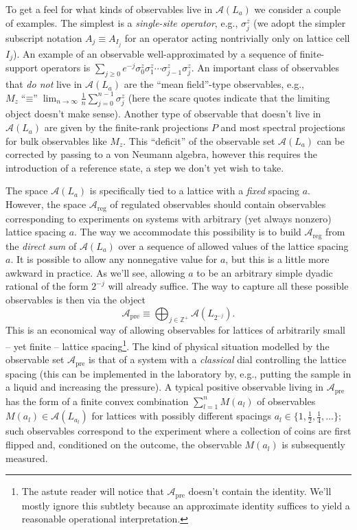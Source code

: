 \documentclass[11pt]{amsart}
\theoremstyle{plain}%
\theoremstyle{definition}
\theoremstyle{remark}
\begin{document}
To get a feel for what kinds of observables live in $\mathcal{A}(L_a)$ we consider a couple of examples. The simplest is a \emph{single-site operator}, e.g., $\sigma^z_j$ (we adopt the simpler subscript notation $A_j \equiv A_{I_j}$ for an operator acting nontrivially only on lattice cell $I_j$). An example of an observable well-approximated by a sequence of finite-support operators is $\sum_{j\ge 0} e^{-j}\sigma^z_0 \sigma_1^z  \cdots \sigma_{j-1}^z\sigma_j^z$. An important class of observables that \emph{do not} live in $\mathcal{A}(L_a)$ are the ``mean field''-type observables, e.g., $M_z \text{``$\equiv$''} \lim_{n\rightarrow\infty}\frac{1}{n}\sum_{j = 0}^{n-1} \sigma^z_j$ (here the scare quotes indicate that the limiting object doesn't make sense). Another type of observable that doesn't live in $\mathcal{A}(L_a)$ are given by the finite-rank projections $P$  and most spectral projections for bulk observables like $M_z$. This ``deficit'' of the observable set $\mathcal{A}(L_a)$ can be corrected by passing to a von Neumann algebra, however this requires the introduction of a reference state, a step we don't yet wish to take. 

The space $\mathcal{A}(L_a)$ is specifically tied to a lattice with a \emph{fixed} spacing $a$. However, the space $\mathcal{A}_{\text{reg}}$ of regulated observables should contain observables corresponding to experiments on systems with arbitrary (yet always nonzero) lattice spacing $a$. The way we accommodate this possibility is to build $\mathcal{A}_{\text{reg}}$ from the \emph{direct sum} of $\mathcal{A}(L_a)$ over a sequence of allowed values of the lattice spacing $a$. It is possible to allow any nonnegative value for $a$, but this is a little more awkward in practice. As we'll see, allowing $a$ to be an arbitrary simple dyadic rational of the form $2^{-j}$ will already suffice. The way to capture all these possible observables is then via the object 
\begin{equation*}
	\mathcal{A}_{\text{pre}} \equiv \bigoplus_{j \in \mathbb{Z}^+} \mathcal{A}(L_{2^{-j}}).
\end{equation*}
This is an economical way of allowing observables for lattices of arbitrarily small -- yet finite -- lattice spacing\footnote{The astute reader will notice that $\mathcal{A}_{\text{pre}}$ doesn't contain the identity. We'll mostly ignore this subtlety because an approximate identity suffices to yield a reasonable operational interpretation.}. The kind of physical situation modelled by the observable set $\mathcal{A}_{\text{pre}}$ is that of a system with a \emph{classical} dial controlling the lattice spacing (this can be implemented in the laboratory by, e.g., putting the sample in a liquid and increasing the pressure). A typical positive observable living in $\mathcal{A}_{\text{pre}}$ has the form of a finite convex combination $\sum_{l=1}^n M(a_l)$ of observables $M(a_l)\in\mathcal{A}(L_{a_l})$ for lattices with possibly different spacings $a_l\in\{1, \frac{1}{2}, \frac{1}{4}, \ldots\}$; such observables correspond to the experiment where a collection of coins are first flipped and, conditioned on the outcome, the observable $M(a_l)$ is subsequently measured. 
\end{document}
